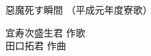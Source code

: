 \documentclass[10pt,b5j]{tarticle} %
\begin{document}
\begin{minipage}[c]{0.7\hsize} %
    \begin{center}
        {\LARGE
            惡魔死す瞬間 %
        }
        {\small 
            （平成元年度寮歌） %
        }
    \end{center}
\end{minipage}
\begin{minipage}[c]{0.3\hsize} %
    \begin{flushright} %
        宜寿次盛生君 作歌\\田口拓君 作曲 %
    \end{flushright}
\end{minipage}
\end{document}
